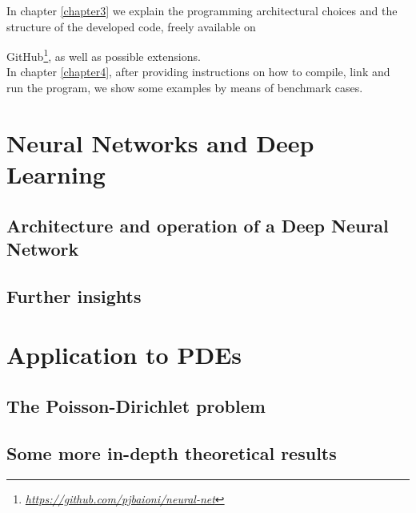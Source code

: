 \documentclass[12pt, a4paper]{report}
\theoremstyle{definition}
\begin{document}
In chapter \ref{chapter3} we explain the programming architectural choices and the structure of the developed code, freely available on {GitHub\footnote{\href{https://github.com/pjbaioni/neural-net}{\emph{https://github.com/pjbaioni/neural-net}}}, as well as possible extensions.\\
In chapter \ref{chapter4}, after providing instructions on how to compile, link and run the program, we show some examples by means of benchmark cases.




\chapter{Neural Networks and Deep Learning}\label{chapter1}

\section{Architecture and operation of a Deep Neural Network}\label{section1.1}

\section{Further insights}\label{section1.2}




\chapter{Application to PDEs}\label{chapter2}

\section{The Poisson-Dirichlet problem}\label{section2.1}

\section{Some more in-depth theoretical results}\label{section2.2}




}
\end{document}
